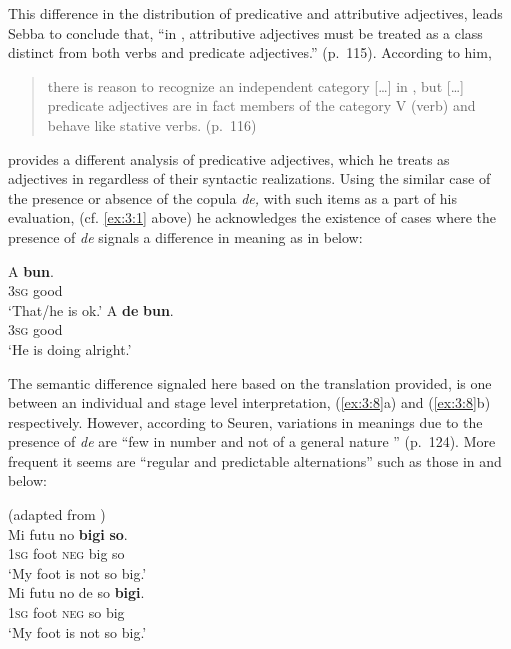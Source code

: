 This difference in the distribution of
predicative and attributive adjectives, leads Sebba to conclude that,
``in , attributive adjectives must be treated as a class distinct
from both verbs and predicate adjectives.” (p.~115). According to him,

\begin{quote}
there is reason to recognize an independent category  […] in
, but […] predicate adjectives are in fact members of the
category V (verb) and behave like stative verbs. (p.~116)
\end{quote}

\citet{Seuren1986} provides a different analysis of predicative
adjectives, which he treats as adjectives in  regardless of
their syntactic realizations. Using the similar case of the presence
or absence of the copula \textit{de,} with such items as a part of his
evaluation, (cf. \ref{ex:3:1} above) he acknowledges the existence of
cases where the presence of \textit{de} signals a difference in
meaning as in  below:

\ea%
\label{ex:3:8}
\ea
\gll A \textbf{bun}.\\
\textsc{3sg} good\\
\glt `That\slash he is ok.'
\ex
	\gll A \textbf{de} \textbf{bun}.\\
\textsc{3sg} {\COP} good\\
\glt `He is doing alright.'\\
\z \z

The semantic difference signaled here based on the translation
provided, is one between an individual and stage level interpretation,
(\ref{ex:3:8}a) and (\ref{ex:3:8}b) respectively.  However, according
to Seuren, variations in meanings due to the presence of \textit{de}
are ``few in number and not of a general nature ” (p.~124). More
frequent it seems are ``regular and predictable alternations” such as
those in  and  below:

\ea \label{ex:3:9}
 (adapted from \citealt[124]{Seuren1986})\\
\ea
\gll  Mi futu  no \textbf{bigi} \textbf{so}.\\
      \textsc{1sg} foot  \textsc{neg} big so\\
\glt `My foot is not so big.'\\

\ex
\gll Mi futu  no      de   so \textbf{bigi}.\\
         \textsc{1sg}  foot  \textsc{neg} {\COP} so big\\
\glt `My foot is not so big.'\\
\z \z


